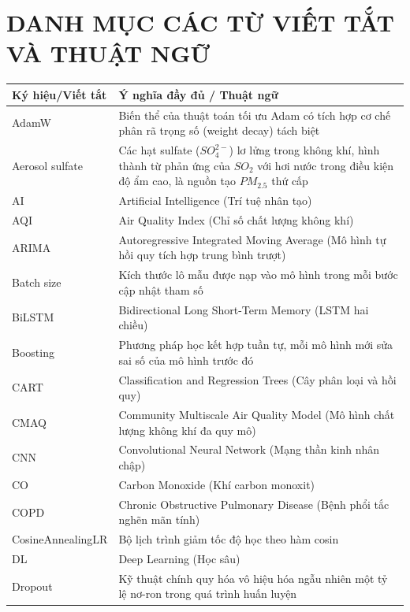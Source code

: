 \chapter*{DANH MỤC CÁC TỪ VIẾT TẮT VÀ THUẬT NGỮ}

\begin{center}
\begin{tabular}{p{3cm} p{11cm}}
    \toprule
    \textbf{Ký hiệu/Viết tắt} & \textbf{Ý nghĩa đầy đủ / Thuật ngữ} \\
    \midrule
    
    AdamW     & Biến thể của thuật toán tối ưu Adam có tích hợp cơ chế phân rã trọng số (weight decay) tách biệt \\
    Aerosol sulfate & Các hạt sulfate ($SO_4^{2-}$) lơ lửng trong không khí, hình thành từ phản ứng của $SO_2$ với hơi nước trong điều kiện độ ẩm cao, là nguồn tạo $PM_{2.5}$ thứ cấp \\
    AI        & Artificial Intelligence (Trí tuệ nhân tạo) \\
    AQI       & Air Quality Index (Chỉ số chất lượng không khí) \\
    ARIMA     & Autoregressive Integrated Moving Average (Mô hình tự hồi quy tích hợp trung bình trượt) \\
    Batch size & Kích thước lô mẫu được nạp vào mô hình trong mỗi bước cập nhật tham số \\
    BiLSTM    & Bidirectional Long Short-Term Memory (LSTM hai chiều) \\
    Boosting  & Phương pháp học kết hợp tuần tự, mỗi mô hình mới sửa sai số của mô hình trước đó \\
    CART      & Classification and Regression Trees (Cây phân loại và hồi quy) \\
    CMAQ      & Community Multiscale Air Quality Model (Mô hình chất lượng không khí đa quy mô) \\
    CNN       & Convolutional Neural Network (Mạng thần kinh nhân chập) \\
    CO        & Carbon Monoxide (Khí carbon monoxit) \\
    COPD      & Chronic Obstructive Pulmonary Disease (Bệnh phổi tắc nghẽn mãn tính) \\
    CosineAnnealingLR & Bộ lịch trình giảm tốc độ học theo hàm cosin \\
    DL        & Deep Learning (Học sâu) \\
    Dropout   & Kỹ thuật chính quy hóa vô hiệu hóa ngẫu nhiên một tỷ lệ nơ-ron trong quá trình huấn luyện \\

\end{tabular}
\end{center}
